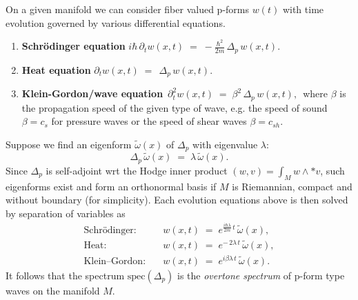\begin{mytheorem}
%
On a given manifold we can consider fiber valued p-forms \(w(t)\) with time evolution governed by various differential equations.
%
\begin{enumerate}
\item \textbf{Schrödinger equation }
\(
 i\hbar\,\partial_t w(x,t)
 \;=\; -\frac{\hbar^2}{2m}\,\Delta_p\,w(x,t).
\)
\item \textbf{Heat equation }
\(
 \partial_t w(x,t)
 \;=\; \,\Delta_p\,w(x,t).
\)
\item \textbf{Klein-Gordon/wave equation}
\(
 \,\partial_t^2 w(x,t)
 \;=\; \beta^2\,\Delta_p\,w(x,t),\,
\)
where \(\beta\) is the propagation speed of the given type of wave, e.g. the speed of sound $\beta=c_s$ for pressure waves or the speed of shear waves $ \beta=c_{sh}$.
%
\end{enumerate}
%
Suppose we find an eigenform \(\tilde{\omega}(x)\) of \(\Delta_p\) with eigenvalue \(\lambda\):
\[
 \Delta_p\,\tilde{\omega}(x) \;=\; \lambda\,\tilde{\omega}(x).
\]
Since \(\Delta_p\) is self-adjoint wrt the Hodge inner product \((w,v)=\int_M w\wedge *v\), such eigenforms exist and form an orthonormal basis if $M$ is Riemannian, compact and without boundary (for simplicity).
%
Each evolution equations above is then solved by separation of variables as 
\begin{align*}
 \text{Schrödinger:}&\quad
 w(x,t) \;=\; e^{\tfrac{i\hbar\lambda}{2m}\,t}\,\tilde{\omega}(x),\\[0.3em]
 \text{Heat:}&\quad
 w(x,t) \;=\; e^{-\,2\lambda\,t}\,\tilde{\omega}(x),\\[0.3em]
 \text{Klein–Gordon:}&\quad
 w(x,t) \;=\; e^{i\beta\lambda\,t}\,\tilde{\omega}(x).
\end{align*}
%
It follows that the spectrum \(\mathrm{spec}(\Delta_p)\) is the \emph{overtone spectrum} of p-form type waves on the manifold \(M\).
%
\end{mytheorem}


